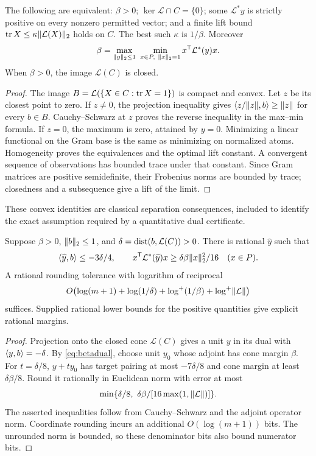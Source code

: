 \begin{proposition}\label{prop:beta}
The following are equivalent: $\beta>0$; $\ker\mathcal L\cap C=\{0\}$; some $\mathcal L^*y$ is strictly positive on every nonzero permitted vector; and a finite lift bound $\operatorname{tr} X\le\kappa\lVert \mathcal L(X)\rVert_2$ holds on $C$. The best such $\kappa$ is $1/\beta$. Moreover
\begin{equation}\label{eq:betadual}
 \beta=\max_{\lVert y\rVert_2\le1}\ \min_{x\in P,\ \lVert x\rVert_2=1}x^{\mathsf T}\mathcal L^*(y)x.
\end{equation}
When $\beta>0$, the image $\mathcal L(C)$ is closed.
\end{proposition}
\begin{proof}
The image $B=\mathcal L(\{X\in C:\operatorname{tr} X=1\})$ is compact and convex. Let $z$ be its closest point to zero. If $z\ne0$, the projection inequality gives $\langle z/\lVert z\rVert,b\rangle\ge\lVert z\rVert$ for every $b\in B$. Cauchy--Schwarz at $z$ proves the reverse inequality in the max--min formula. If $z=0$, the maximum is zero, attained by $y=0$. Minimizing a linear functional on the Gram base is the same as minimizing on normalized atoms. Homogeneity proves the equivalences and the optimal lift constant. A convergent sequence of observations has bounded trace under that constant. Since Gram matrices are positive semidefinite, their Frobenius norms are bounded by trace; closedness and a subsequence give a lift of the limit.
\end{proof}

These convex identities are classical separation consequences, included to identify the exact assumption required by a quantitative dual certificate.

\begin{proposition}\label{prop:strictsep}
Suppose $\beta>0$, $\lVert b\rVert_2\le1$, and $\delta=\operatorname{dist}(b,\mathcal L(C))>0$. There is rational $\widehat y$ such that
\[
 \langle \widehat y,b\rangle\le-3\delta/4,\qquad
 x^{\mathsf T}\mathcal L^*(\widehat y)x\ge\delta\beta\lVert x\rVert_2^2/16\quad(x\in P).
\]
A rational rounding tolerance with logarithm of reciprocal
\[
 O\bigl(\log(m+1)+\log(1/\delta)+\log^+(1/\beta)+\log^+\lVert \mathcal L\rVert\bigr)
\]
suffices. Supplied rational lower bounds for the positive quantities give explicit rational margins.
\end{proposition}
\begin{proof}
Projection onto the closed cone $\mathcal L(C)$ gives a unit $y$ in its dual with $\langle y,b\rangle=-\delta$. By \eqref{eq:betadual}, choose unit $y_0$ whose adjoint has cone margin $\beta$. For $t=\delta/8$, $y+ty_0$ has target pairing at most $-7\delta/8$ and cone margin at least $\delta\beta/8$. Round it rationally in Euclidean norm with error at most
\[
 \min\{\delta/8,\ \delta\beta/[16\max(1,\norm{\mathcal L})]\}.
\]
The asserted inequalities follow from Cauchy--Schwarz and the adjoint operator norm. Coordinate rounding incurs an additional $O(\log(m+1))$ bits. The unrounded norm is bounded, so these denominator bits also bound numerator bits.
\end{proof}

